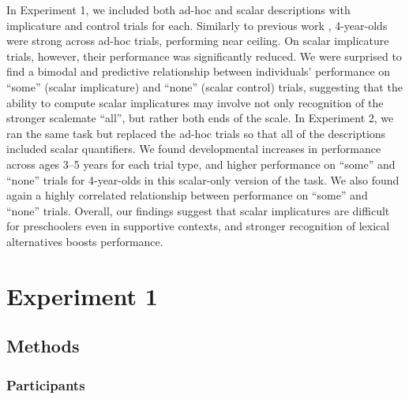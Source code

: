 \documentclass[10pt,letterpaper]{article}
\begin{document}
In Experiment 1, we included both ad-hoc and scalar descriptions with implicature and control trials for each. Similarly to previous work \cite[e.g.][]{stiller2014}, 4-year-olds were strong across ad-hoc trials, performing near ceiling. On scalar implicature trials, however, their performance was significantly reduced. We were surprised to find a bimodal and predictive relationship between individuals' performance on ``some'' (scalar implicature) and ``none'' (scalar control) trials, suggesting that the ability to compute scalar implicatures may involve not only recognition of the stronger scalemate ``all'', but rather both ends of the scale. In Experiment 2, we ran the same task but replaced the ad-hoc trials so that all of the descriptions included scalar quantifiers. We found developmental increases in performance across ages 3--5 years for each trial type, and higher performance on ``some'' and ``none'' trials for 4-year-olds in this scalar-only version of the task. We also found again a highly correlated relationship between performance on ``some'' and ``none'' trials. Overall, our findings suggest that scalar implicatures are difficult for preschoolers even in supportive contexts, and stronger recognition of lexical alternatives boosts performance. 





	

\section{Experiment 1} 

\subsection{Methods}
\subsubsection{Participants}
\end{document}
